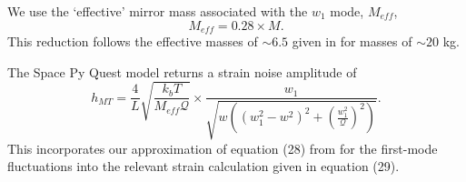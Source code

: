 \documentclass{article}
\begin{document}
\begin{itemize}
\begin{itemize}
    We use the `effective' mirror mass associated with the $w_1$ mode, $M_{eff}$,
    \[
    M_{eff} = 0.28\times M.
    \]
    This reduction follows the effective masses of $\sim 6.5$ given in
    \cite{VIRGO} for masses of $\sim 20$ kg.
    
    The Space Py Quest model returns a strain noise amplitude of
    \begin{equation}
    \label{eqn::mirror}
     h_{MT} =  \frac{4}{L}\sqrt{\frac{k_bT}{M_{eff}\mathcal{Q}}}\times\frac{w_1}{\sqrt{w\left((w_1^2 - w^2)^2 + \left(\frac{w_1^2}{\mathcal{Q}}\right)^2\right)}}.
    \end{equation}
    This incorporates our approximation of equation (28) from
    \cite{VIRGO} for the first-mode fluctuations into the relevant
    strain calculation given in equation (29).
    

\end{itemize}
\end{itemize}
\end{document}
